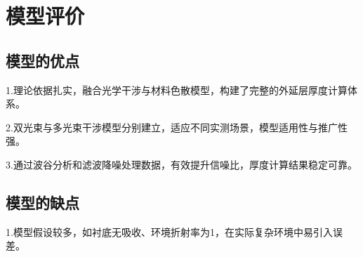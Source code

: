 \documentclass[UTF8]{ctexart}
\begin{document}
\section{模型评价}
\subsection{模型的优点}
1.理论依据扎实，融合光学干涉与材料色散模型，构建了完整的外延层厚度计算体系。\par

2.双光束与多光束干涉模型分别建立，适应不同实测场景，模型适用性与推广性强。
\par
3.通过波谷分析和滤波降噪处理数据，有效提升信噪比，厚度计算结果稳定可靠。\par
\subsection{模型的缺点}
1.模型假设较多，如衬底无吸收、环境折射率为1，在实际复杂环境中易引入误差。\par
\end{document}
